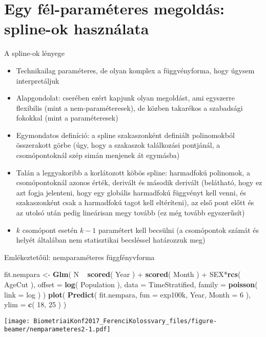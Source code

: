 \documentclass[ignorenonframetext,]{beamer}
\newenvironment{Shaded}{\begin{snugshade}}{\end{snugshade}}
\newcommand{\KeywordTok}[1]{\textcolor[rgb]{0.13,0.29,0.53}{\textbf{{#1}}}}
\newcommand{\DataTypeTok}[1]{\textcolor[rgb]{0.13,0.29,0.53}{{#1}}}
\newcommand{\DecValTok}[1]{\textcolor[rgb]{0.00,0.00,0.81}{{#1}}}
\newcommand{\StringTok}[1]{\textcolor[rgb]{0.31,0.60,0.02}{{#1}}}
\newcommand{\NormalTok}[1]{{#1}}
\providecommand{\tightlist}{%
\setlength{\itemsep}{0pt}\setlength{\parskip}{0pt}}
\begin{document}
\section{Egy fél-paraméteres megoldás: spline-ok
használata}\label{egy-fel-parameteres-megoldas-spline-ok-hasznalata}

\begin{frame}[allowframebreaks]{A spline-ok lényege}

\begin{itemize}
\tightlist
\item
  Technikailag paraméteres, de olyan komplex a függvényforma, hogy
  úgysem interpretáljuk
\item
  Alapgondolat: cserében ezért kapjunk olyan megoldást, ami egyszerre
  flexibilis (mint a nem-paraméteresek), de közben takarékos a
  szabadsági fokokkal (mint a paraméteresek)
\item
  Egymondatos definíció: a spline szakaszonként definiált polinomokból
  összerakott görbe (úgy, hogy a szakaszok találkozási pontjánál, a
  csomópontoknál szép simán menjenek át egymásba)
\item
  Talán a leggyakoribb a korlátozott köbös spline: harmadfokú polinomok,
  a csomópontoknál azonos érték, derivált és második derivált
  (belátható, hogy ez azt fogja jelenteni, hogy egy globális harmadfokú
  függvényt kell venni, és szakaszonként csak a harmadfokú tagot kell
  eltéríteni), az első pont előtt és az utolsó után pedig lineárisan
  megy tovább (ez még tovább egyszerűsít)
\item
  \(k\) csomópont esetén \(k-1\) paramétert kell becsülni (a csomópontok
  számát és helyét általában nem statisztikai becsléssel határozzuk meg)
\end{itemize}

\end{frame}

\begin{frame}[fragile]{Emlékeztetőül: nemparaméteres függfényvforma}

\begin{Shaded}
\begin{Highlighting}[]
\NormalTok{fit.nempara <-}\StringTok{ }\KeywordTok{Glm}\NormalTok{( N ~}\StringTok{ }\KeywordTok{scored}\NormalTok{( Year ) +}\StringTok{ }\KeywordTok{scored}\NormalTok{( Month ) +}\StringTok{ }\NormalTok{SEX*}\KeywordTok{rcs}\NormalTok{( AgeCut ),}
                    \DataTypeTok{offset =} \KeywordTok{log}\NormalTok{( Population ), }\DataTypeTok{data =} \NormalTok{TimeStratified,}
                    \DataTypeTok{family =} \KeywordTok{poisson}\NormalTok{( }\DataTypeTok{link =} \NormalTok{log ) )}
\KeywordTok{plot}\NormalTok{( }\KeywordTok{Predict}\NormalTok{( fit.nempara, }\DataTypeTok{fun =} \NormalTok{exp100k, Year, }\DataTypeTok{Month =} \DecValTok{6} \NormalTok{), }\DataTypeTok{ylim =} \KeywordTok{c}\NormalTok{( }\DecValTok{18}\NormalTok{, }\DecValTok{25} \NormalTok{) )}
\end{Highlighting}
\end{Shaded}

\texttt{[image: BiometriaiKonf2017\_FerenciKolossvary\_files/figure-beamer/nemparameteres2-1.pdf]}

\end{frame}
\end{document}
